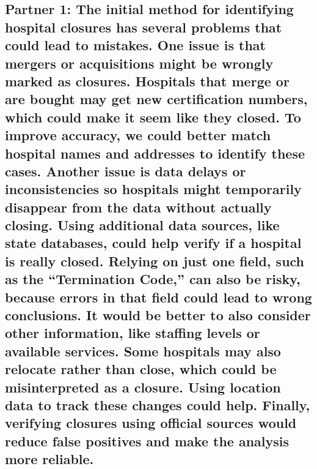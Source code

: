 \documentclass[
  letterpaper,
  DIV=11,
  numbers=noendperiod]{scrartcl}
\begin{document}
\subsection{Partner 1: The initial method for identifying hospital
closures has several problems that could lead to mistakes. One issue is
that mergers or acquisitions might be wrongly marked as closures.
Hospitals that merge or are bought may get new certification numbers,
which could make it seem like they closed. To improve accuracy, we could
better match hospital names and addresses to identify these cases.
Another issue is data delays or inconsistencies so hospitals might
temporarily disappear from the data without actually closing. Using
additional data sources, like state databases, could help verify if a
hospital is really closed. Relying on just one field, such as the
``Termination Code,'' can also be risky, because errors in that field
could lead to wrong conclusions. It would be better to also consider
other information, like staffing levels or available services. Some
hospitals may also relocate rather than close, which could be
misinterpreted as a closure. Using location data to track these changes
could help. Finally, verifying closures using official sources would
reduce false positives and make the analysis more
reliable.}\label{partner-1-the-initial-method-for-identifying-hospital-closures-has-several-problems-that-could-lead-to-mistakes.-one-issue-is-that-mergers-or-acquisitions-might-be-wrongly-marked-as-closures.-hospitals-that-merge-or-are-bought-may-get-new-certification-numbers-which-could-make-it-seem-like-they-closed.-to-improve-accuracy-we-could-better-match-hospital-names-and-addresses-to-identify-these-cases.-another-issue-is-data-delays-or-inconsistencies-so-hospitals-might-temporarily-disappear-from-the-data-without-actually-closing.-using-additional-data-sources-like-state-databases-could-help-verify-if-a-hospital-is-really-closed.-relying-on-just-one-field-such-as-the-termination-code-can-also-be-risky-because-errors-in-that-field-could-lead-to-wrong-conclusions.-it-would-be-better-to-also-consider-other-information-like-staffing-levels-or-available-services.-some-hospitals-may-also-relocate-rather-than-close-which-could-be-misinterpreted-as-a-closure.-using-location-data-to-track-these-changes-could-help.-finally-verifying-closures-using-official-sources-would-reduce-false-positives-and-make-the-analysis-more-reliable.}
\end{document}
